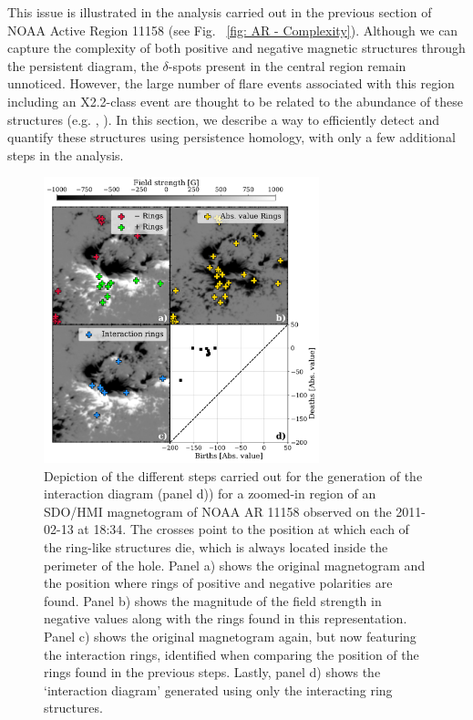 \documentclass[12pt]{mythesis}
\begin{document}
This issue is illustrated in the analysis carried out in the previous section of NOAA Active Region 11158 (see Fig. ~\ref{fig:  AR - Complexity}). Although we can capture the complexity of both positive and negative magnetic structures through the persistent diagram, the $\delta$-spots present in the central region remain unnoticed. However, the large number of flare events associated with this region including an X2.2-class event are thought to be related to the abundance of these structures (e.g. \citealt{x21}, \citealt{x22}). In this section, we describe a way to efficiently detect and quantify these structures using persistence homology, with only a few additional steps in the analysis.

\begin{figure}
    \centering
    \includegraphics[width=8cm]{figures/PersistentHomology/InteractingDiagram.pdf}
    \caption{
      Depiction of the different steps carried out for the generation of the interaction diagram (panel d)) for a zoomed-in region of an SDO/HMI magnetogram of NOAA AR 11158 observed on the 2011-02-13 at 18:34. The crosses point to the position at which each of the ring-like structures die, which is always located inside the perimeter of the hole. Panel a) shows the original magnetogram and the position where rings of positive and negative polarities are found. Panel b) shows the magnitude of the field strength in negative values along with the rings found in this representation. Panel c) shows the original magnetogram again, but now featuring the interaction rings, identified when comparing the position of the rings found in the previous steps. Lastly, panel d) shows the `interaction diagram' generated using only the interacting ring structures.}
    \label{fig: Interacting_diagram}
\end{figure}
\end{document}
